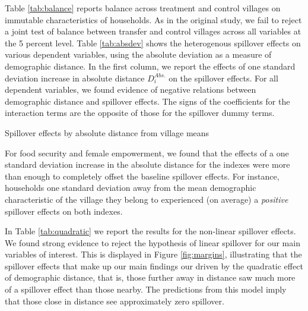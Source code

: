 \documentclass[11pt]{article}
\begin{document}
    Table \ref{tab:balance} reports balance across treatment and control villages on immutable characteristics of households. As in the original study, we fail to reject a joint test of balance between transfer and control villages across all variables at the 5 percent level. Table \ref{tab:absdev} shows the heterogenous spillover effects on various dependent variables, using the absolute deviation as a measure of demographic distance. In the first column, we report the effects of one standard deviation increase in absolute distance  $D_i^{Abs.}$ on the spillover effects. For all dependent variables, we found evidence of negative relations between demographic distance and spillover effects. The signs of the coefficients for the interaction terms are the opposite of those for the spillover dummy terms. \\

    \begin{table}[H]
    \centering
    \caption{Spillover effects by absolute distance from village means}
    \label{tab:absdev}
    \end{table}

    For food security and female empowerment, we found that the effects of a one standard deviation increase in the absolute distance  for the indexes were more than enough to completely offset the baseline spillover effects. For instance, households one standard deviation away from the mean demographic characteristic of the village they belong to experienced (on average) a \textit{positive} spillover effects on both indexes.

    In Table \ref{tab:quadratic} we report the results for the non-linear spillover effects.
    We found strong evidence to reject the hypothesis of linear spillover for our main variables of interest.
    This is displayed in Figure \ref{fig:margins}, illustrating that the spillover effects that make up our main findings our driven by the quadratic effect of demographic distance, that is, those further away in distance saw much more of a spillover effect than those nearby.
    The predictions from this model imply that those close in distance see approximately zero spillover.
\end{document}
